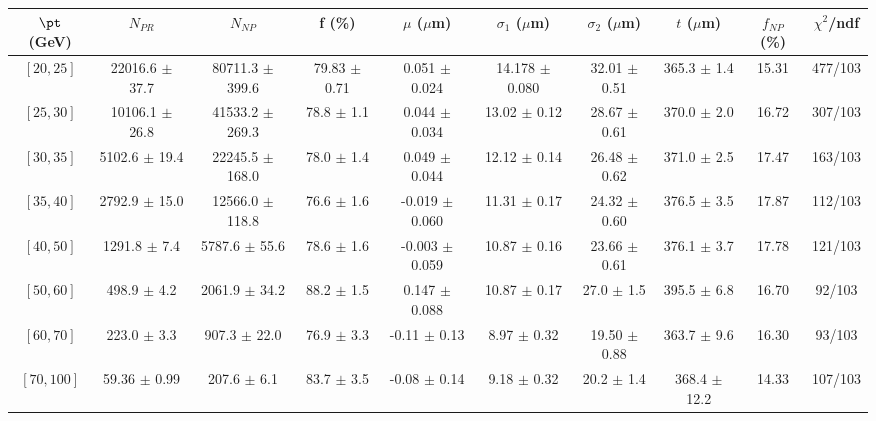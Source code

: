 \begin{tabular}{c||c|c|c|c|c|c|c||c|c}
$\pt$ (GeV) & $N_{PR}$ & $N_{NP}$ & f (\%) & $\mu$ ($\mu$m) & $\sigma_1$ ($\mu$m) & $\sigma_2$ ($\mu$m)  & $t$ ($\mu$m) & $f_{NP}$ (\%) & $\chi^2$/ndf \\
\hline
$[20, 25]$ & 22016.6 $\pm$ 37.7 & 80711.3 $\pm$ 399.6 & 79.83 $\pm$ 0.71 & 0.051 $\pm$ 0.024 & 14.178 $\pm$ 0.080 & 32.01 $\pm$ 0.51 & 365.3 $\pm$ 1.4 & 15.31 & 477/103\\
$[25, 30]$ & 10106.1 $\pm$ 26.8 & 41533.2 $\pm$ 269.3 & 78.8 $\pm$ 1.1 & 0.044 $\pm$ 0.034 & 13.02 $\pm$ 0.12 & 28.67 $\pm$ 0.61 & 370.0 $\pm$ 2.0 & 16.72 & 307/103\\
$[30, 35]$ & 5102.6 $\pm$ 19.4 & 22245.5 $\pm$ 168.0 & 78.0 $\pm$ 1.4 & 0.049 $\pm$ 0.044 & 12.12 $\pm$ 0.14 & 26.48 $\pm$ 0.62 & 371.0 $\pm$ 2.5 & 17.47 & 163/103\\
$[35, 40]$ & 2792.9 $\pm$ 15.0 & 12566.0 $\pm$ 118.8 & 76.6 $\pm$ 1.6 & -0.019 $\pm$ 0.060 & 11.31 $\pm$ 0.17 & 24.32 $\pm$ 0.60 & 376.5 $\pm$ 3.5 & 17.87 & 112/103\\
$[40, 50]$ & 1291.8 $\pm$ 7.4 & 5787.6 $\pm$ 55.6 & 78.6 $\pm$ 1.6 & -0.003 $\pm$ 0.059 & 10.87 $\pm$ 0.16 & 23.66 $\pm$ 0.61 & 376.1 $\pm$ 3.7 & 17.78 & 121/103\\
$[50, 60]$ & 498.9 $\pm$ 4.2 & 2061.9 $\pm$ 34.2 & 88.2 $\pm$ 1.5 & 0.147 $\pm$ 0.088 & 10.87 $\pm$ 0.17 & 27.0 $\pm$ 1.5 & 395.5 $\pm$ 6.8 & 16.70 & 92/103\\
$[60, 70]$ & 223.0 $\pm$ 3.3 & 907.3 $\pm$ 22.0 & 76.9 $\pm$ 3.3 & -0.11 $\pm$ 0.13 & 8.97 $\pm$ 0.32 & 19.50 $\pm$ 0.88 & 363.7 $\pm$ 9.6 & 16.30 & 93/103\\
$[70, 100]$ & 59.36 $\pm$ 0.99 & 207.6 $\pm$ 6.1 & 83.7 $\pm$ 3.5 & -0.08 $\pm$ 0.14 & 9.18 $\pm$ 0.32 & 20.2 $\pm$ 1.4 & 368.4 $\pm$ 12.2 & 14.33 & 107/103\\
\end{tabular}
